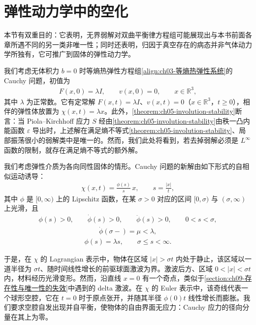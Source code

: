 \documentclass[../../main.tex]{subfiles}
\begin{document}
\section{弹性动力学中的空化}\label{section:ch18-弹性动力学空化}

本节有双重目的：它表明，无界弱解对双曲平衡律方程组可能展现出与本书前面各章所遇不同的另一类非唯一性；同时还表明，归因于真空存在的病态并非气体动力学所独有，它可推广到固体的弹性动力学。

我们考虑无体积力 $b=0$ 时等熵热弹性方程组\eqref{align:ch03-等熵热弹性系统}的 Cauchy 问题，初值为
\begin{align}
F(x,0)=\lambda I,\qquad v(x,0)=0,\qquad x\in\mathbb{R}^3,
\label{align:ch18-1881}
\end{align}
其中 $\lambda$ 为正常数。它有定常解 $F(x,t)=\lambda I$、$v(x,t)=0$（$x\in\mathbb{R}^3$，$t\geqslant0$），相伴的弹性体放置为 $\chi(x,t)=\lambda x$。此外，\cref{theorem:ch05-involution-stability}断言：当 Piola--Kirchhoff 应力 $S$ 经由\cref{theorem:ch05-involution-stability}由秩一凸内能函数 $\varepsilon$ 导出时，上述解在满足熵不等式\cref{theorem:ch05-involution-stability}、局部振荡很小的弱解类中是唯一的。然而，我们此处将看到，若去掉弱解必须是 $L^\infty$ 函数的限制，就存在满足熵不等式的额外解。

我们考虑弹性介质为各向同性固体的情形。Cauchy 问题的新解由如下形式的自相似运动诱导：
\begin{align}
\chi(x,t)=\frac{\phi(s)}{s}\,x,\qquad s=\frac{|x|}{t},
\label{align:ch18-1882}
\end{align}
其中 $\phi$ 是 $[0,\infty)$ 上的 Lipschitz 函数，在某 $\sigma>0$ 对应的区间 $[0,\sigma)$ 与 $(\sigma,\infty)$ 上光滑，且
\begin{align}
\phi(s)>0,\qquad \dot\phi(s)>0,\qquad \ddot\phi(s)>0,\qquad 0<s<\sigma,
\label{align:ch18-1883}
\end{align}
\begin{align}
\dot\phi(\sigma-)=\mu<\lambda,
\label{align:ch18-1884}
\end{align}
\begin{align}
\phi(s)=\lambda s,\qquad \sigma\leqslant s<\infty.
\label{align:ch18-1885}
\end{align}

于是，在 $\chi$ 的 Lagrangian 表示中，物体在区域 $|x|>\sigma t$ 内处于静止，该区域以一道半径为 $\sigma t$、随时间线性增长的前驱球面激波为界。激波后方、区域 $0<|x|<\sigma t$ 内，材料经历光滑变形。然而，沿直线 $x=0$ 有一个奇点，类似于\cref{section:ch09-存在性与唯一性的失效}中遇到的 delta 激波。在 $\chi$ 的 Euler 表示中，该奇线代表一个球形空腔，它在 $t=0$ 时于原点张开，并随其半径 $\phi(0)t$ 线性增长而膨胀。我们要求空腔自发出现并自平衡，使物体的自由界面无应力：Cauchy 应力的径向分量在其上为零。
\end{document}
